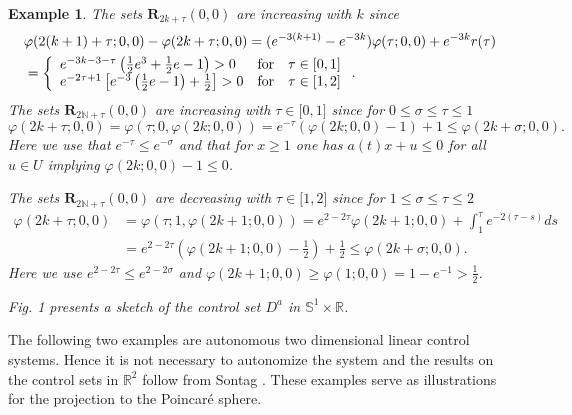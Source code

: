 \documentclass{siamltex}%
\newtheorem{example}[theorem]{Example}
\begin{document}
\begin{example}
The sets $\mathbf{R}_{2k+\tau}(0,0)$ are increasing with $k$ since%
\begin{align*}
&  \varphi(2(k+1)+\tau;0,0)-\varphi(2k+\tau;0,0)=(e^{-3(k+1)}-e^{-3k}%
)\varphi(\tau;0,0)+e^{-3k}r(\tau)\\
&  =\left\{
\begin{array}
[c]{lll}%
e^{-3k-3-\tau}\left(  \frac{1}{2}e^{3}+\frac{1}{2}e-1\right)  >0 & \text{for}
& \tau\in\lbrack0,1]\\
e^{-2\tau+1}\left[  e^{-3}\left(  \frac{1}{2}e-1\right)  +\frac{1}{2}\right]
>0 & \text{for} & \tau\in\lbrack1,2]
\end{array}
\right.  .
\end{align*}
The sets $\mathbf{R}_{2\mathbb{N}+\tau}(0,0)$ are increasing with $\tau
\in\lbrack0,1]$ since for $0\leq\sigma\leq\tau\leq1$
\[
\varphi(2k+\tau;0,0)=\varphi(\tau;0,\varphi(2k;0,0))=e^{-\tau}(\varphi
(2k;0,0)-1)+1\leq\varphi(2k+\sigma;0,0).
\]
Here we use that $e^{-\tau}\leq e^{-\sigma}$ and that for $x\geq1$ one has
$a(t)x+u\leq0$ for all $u\in U$ implying $\varphi(2k;0,0)-1\leq0$.

The sets $\mathbf{R}_{2\mathbb{N}+\tau}(0,0)$ are decreasing with $\tau
\in\lbrack1,2]$ since for $1\leq\sigma\leq\tau\leq2$%
\begin{align*}
\varphi(2k+\tau;0,0)  &  =\varphi(\tau;1,\varphi(2k+1;0,0))=e^{2-2\tau}%
\varphi(2k+1;0,0)+\int_{1}^{\tau}e^{-2(\tau-s)}ds\\
&  =e^{2-2\tau}(\varphi(2k+1;0,0)-\frac{1}{2})+\frac{1}{2}\leq\varphi
(2k+\sigma;0,0).
\end{align*}
Here we use $e^{2-2\tau}\leq e^{2-2\sigma}$ and $\varphi(2k+1;0,0)\geq
\varphi(1;0,0)=1-e^{-1}>\frac{1}{2}$.

Fig. 1 presents a sketch of the control set $D^{a}$ in $\mathbb{S}^{1}%
\times\mathbb{R}$.
\end{example}

The following two examples are autonomous two dimensional linear control
systems. Hence it is not necessary to autonomize the system and the results on
the control sets in $\mathbb{R}^{2}$ follow from Sontag \cite[Corollary
3.6.7]{Son98}. These examples serve as illustrations for the projection to the
Poincar\'{e} sphere.
\end{document}

